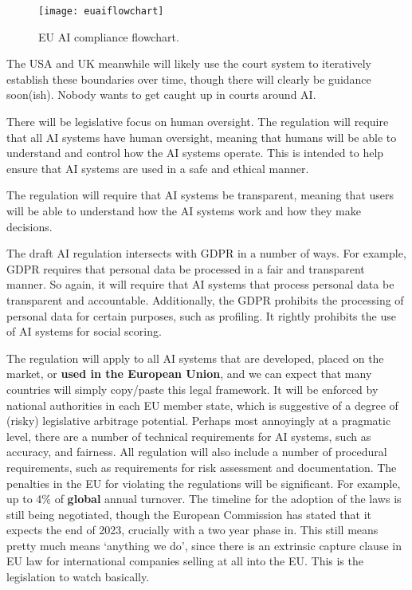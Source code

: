 \begin{figure}[H]
    \centering
    \texttt{[image: euaiflowchart]}
    \caption{EU AI compliance flowchart.}
    \label{fig:euAIcompliance}
\end{figure}

The USA and UK meanwhile will likely use the court system to iteratively establish these boundaries over time, though there will clearly be guidance soon(ish). Nobody wants to get caught up in courts around AI.\par
There will be legislative focus on human oversight. The regulation will require that all AI systems have human oversight, meaning that humans will be able to understand and control how the AI systems operate. This is intended to help ensure that AI systems are used in a safe and ethical manner.\par 
The regulation will require that AI systems be transparent, meaning that users will be able to understand how the AI systems work and how they make decisions.\par
The draft AI regulation intersects with GDPR in a number of ways. For example, GDPR requires that personal data be processed in a fair and transparent manner. So again, it will require that AI systems that process personal data be transparent and accountable. Additionally, the GDPR prohibits the processing of personal data for certain purposes, such as profiling. It rightly prohibits the use of AI systems for social scoring. \par
The regulation will apply to all AI systems that are developed, placed on the market, or \textbf{used in the European Union}, and we can expect that many countries will simply copy/paste this legal framework. It will be enforced by national authorities in each EU member state, which is suggestive of a degree of (risky) legislative arbitrage potential. Perhaps most annoyingly at a pragmatic level, there are a number of technical requirements for AI systems, such as accuracy, and fairness. All regulation will also include a number of procedural requirements, such as requirements for risk assessment and documentation. The penalties in the EU for violating the regulations will be significant. For example, up to 4\% of \textbf{global} annual turnover. The timeline for the adoption of the laws is still being negotiated, though the European Commission has stated that it expects the end of 2023, crucially with a two year phase in. This still means pretty much means `anything we do', since there is an extrinsic capture clause in EU law for international companies selling at all into the EU. This is the legislation to watch basically.\par
